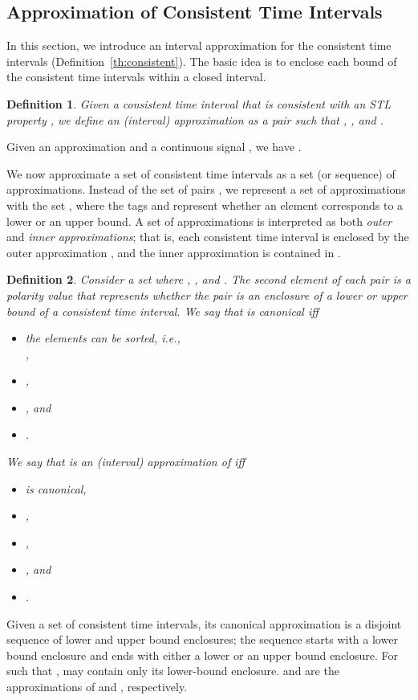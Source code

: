 \documentclass[paper]{ieice}
\newtheorem{definition}{Definition}
\begin{document}
\subsection{Approximation of Consistent Time Intervals}
\label{s:method:approx}

In this section, we introduce an interval approximation for the consistent time intervals (Definition~\ref{th:consistent}).
The basic idea is to enclose each bound of the consistent time intervals within a closed interval.
\begin{definition} \label{d:acti}
	Given a consistent time interval  that is consistent with an STL property , we define an \emph{(interval) approximation} as a pair  such that , , and .
\end{definition}
Given an approximation  and a continuous signal , we have .

We now approximate a set of consistent time intervals  as a set (or sequence) of approximations.
Instead of the set of pairs ,
we represent a set of approximations with the set , where the tags  and  represent whether an element corresponds to a lower or an upper bound.
A set of approximations is interpreted as both \emph{outer} and \emph{inner approximations};
that is, each consistent time interval  is enclosed by the outer approximation , and the inner approximation  is contained in  .
\begin{definition} \label{d:approxs}
	Consider a set  where , , and .
	The second element of each pair is a \emph{polarity value} that represents whether the pair is an enclosure of a lower or upper bound of a consistent time interval.
We say that  is \emph{canonical} iff
	\begin{itemize}
		\item the elements can be sorted, i.e.,\\ ,
		\item , 
		\item , and
		\item .
	\end{itemize}
We say that  is an \emph{(interval) approximation} of 
iff
	\begin{itemize}
	\item  is canonical,
	\item , 
	\item , 
	\item , and
	\item .
	\end{itemize}
\end{definition}
Given a set of consistent time intervals, its canonical approximation is a disjoint sequence of lower and upper bound enclosures; the sequence starts with a lower bound enclosure and ends with either a lower or an upper bound enclosure.
For  such that ,  may contain only its lower-bound enclosure.
 and  are the approximations of  and , respectively.
\end{document}
